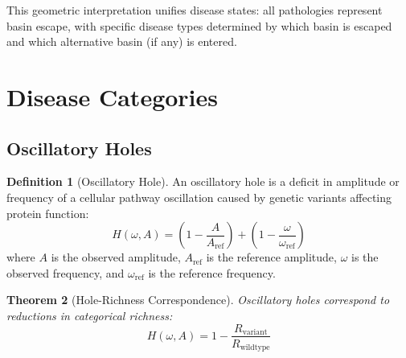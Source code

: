 \documentclass[11pt,twocolumn,a4paper]{article}
\newtheorem{theorem}{Theorem}[section]
\theoremstyle{definition}
\newtheorem{definition}[theorem]{Definition}
\theoremstyle{remark}
\begin{document}
This geometric interpretation unifies disease states: all pathologies represent basin escape, with specific disease types determined by which basin is escaped and which alternative basin (if any) is entered.

\section{Disease Categories}
\label{sec:disease_categories}

\subsection{Oscillatory Holes}

\begin{definition}[Oscillatory Hole]
\label{def:oscillatory_hole}
An oscillatory hole is a deficit in amplitude or frequency of a cellular pathway oscillation caused by genetic variants affecting protein function:
\begin{equation}
H(\omega, A) = \left(1 - \frac{A}{A_{\mathrm{ref}}}\right) + \left(1 - \frac{\omega}{\omega_{\mathrm{ref}}}\right)
\label{eq:oscillatory_hole}
\end{equation}
where $A$ is the observed amplitude, $A_{\mathrm{ref}}$ is the reference amplitude, $\omega$ is the observed frequency, and $\omega_{\mathrm{ref}}$ is the reference frequency.
\end{definition}

\begin{theorem}[Hole-Richness Correspondence]
\label{thm:hole_richness}
Oscillatory holes correspond to reductions in categorical richness:
\begin{equation}
H(\omega, A) = 1 - \frac{R_{\mathrm{variant}}}{R_{\mathrm{wildtype}}}
\label{eq:hole_richness_correspondence}
\end{equation}
\end{theorem}
\end{document}
